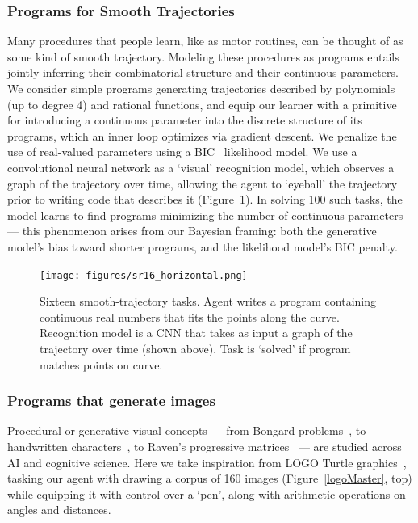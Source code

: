 \documentclass{article}
\begin{document}
\subsubsection{Programs for Smooth Trajectories}\label{regressionSection}
Many procedures that people learn, like as motor routines, can be
thought of as some kind of smooth trajectory. Modeling these
procedures as programs entails jointly inferring their combinatorial
structure and their continuous parameters.  We consider simple
programs generating trajectories described by polynomials (up to
degree 4) and rational functions, and equip our learner with a
primitive for introducing a continuous parameter into the discrete
structure of its programs, which an inner loop optimizes via gradient
descent. We penalize the use of real-valued parameters using a
BIC~\cite{Bishop:2006:PRM:1162264} likelihood model.  We use a convolutional neural
network as a `visual' recognition model, which observes a graph of the
trajectory over time, allowing the agent to `eyeball' the trajectory
prior to writing code that describes it
(Figure~\ref{symbolicRegressionExamples}).  In solving 100 such tasks,
the model learns to find programs minimizing the number of continuous
parameters --- this phenomenon arises from our Bayesian framing: both
the generative model's bias toward shorter programs, and the likelihood
model's BIC penalty.
\begin{figure}[b]
    \texttt{[image: figures/sr16\_horizontal.png]}
  \caption{Sixteen smooth-trajectory tasks. Agent writes a program containing continuous real numbers that fits the points along the curve. Recognition model is a CNN that takes as input a graph of the trajectory over time (shown above). Task is `solved' if program matches points on curve.}\label{symbolicRegressionExamples}
  \end{figure}
\subsubsection{Programs that generate images}\label{logoSection}

Procedural or generative visual concepts 
--- from Bongard problems~\cite{Moscow}, to handwritten characters~\cite{lake2015human,hofstadter1993letter}, to Raven's progressive
matrices~\cite{raven2003raven} --- are studied across AI and cognitive science.  Here we take
inspiration from LOGO Turtle graphics~\cite{turtle}, tasking our agent
with drawing a corpus of 160 images (Figure~\ref{logoMaster}, top) while equipping it with control
over a `pen', along with arithmetic operations on angles and
distances.
\end{document}
